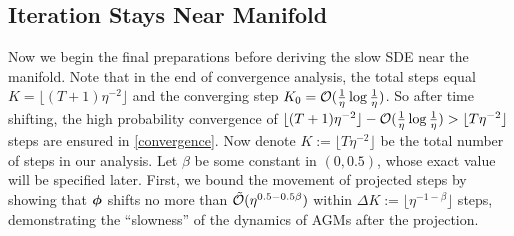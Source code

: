 


\subsection{Iteration Stays Near Manifold}\label{sec:iter-near-manifold}
Now we begin the final preparations before deriving the slow SDE near the manifold. 
Note that in the end of convergence analysis, the total steps equal $K = \lfloor(T+1) \eta^{-2} \rfloor$ and the converging step $K_0 = \mathcal{O}(\frac{1}{\eta}\log \frac{1}{\eta})$. So after time shifting, the high probability convergence of $\lfloor(T+1) \eta^{-2} \rfloor - \mathcal{O}(\frac{1}{\eta}\log \frac{1}{\eta}) > \lfloor T\eta^{-2}\rfloor$ steps are ensured in \cref{convergence}. Now denote $K := \lfloor T\eta^{-2}\rfloor$ be the total number of steps in our analysis.  Let $\beta$ be some constant in $(0, 0.5)$, whose exact value will be specified later. First, we bound the movement of projected steps by showing that ${\bm{\phi}}$ shifts no more than $\tilde{\mathcal{O}}(\eta^{0.5-0.5\beta})$ within $\Delta K := \lfloor\eta^{-1-\beta}\rfloor$ steps, demonstrating the ``slowness'' of the dynamics of AGMs after the projection. 


